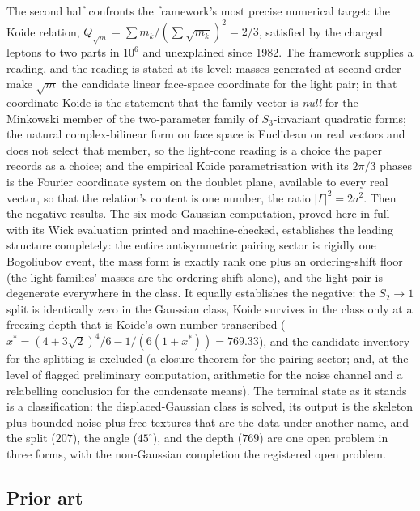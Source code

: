\documentclass[11pt]{article}
\theoremstyle{definition}
\begin{document}
The second half confronts the framework's most precise numerical target: the Koide relation, $Q_{\sqrt{m}} = \sum m_{k} / (\sum \sqrt{m_{k}})^{2} = 2/3$, satisfied by the charged leptons to two parts in $10^{6}$ and unexplained since 1982. The framework supplies a reading, and the reading is stated at its level: masses generated at second order make $\sqrt{m}$ the candidate linear face-space coordinate for the light pair; in that coordinate Koide is the statement that the family vector is \emph{null} for the Minkowski member of the two-parameter family of $S_{3}$-invariant quadratic forms; the natural complex-bilinear form on face space is Euclidean on real vectors and does not select that member, so the light-cone reading is a choice the paper records as a choice; and the empirical Koide parametrisation with its $2\pi/3$ phases is the Fourier coordinate system on the doublet plane, available to every real vector, so that the relation's content is one number, the ratio $|\Gamma|^{2} = 2a^{2}$. Then the negative results. The six-mode Gaussian computation, proved here in full with its Wick evaluation printed and machine-checked, establishes the leading structure completely: the entire antisymmetric pairing sector is rigidly one Bogoliubov event, the mass form is exactly rank one plus an ordering-shift floor (the light families' masses are the ordering shift alone), and the light pair is degenerate everywhere in the class. It equally establishes the negative: the $S_{2} \to 1$ split is identically zero in the Gaussian class, Koide survives in the class only at a freezing depth that is Koide's own number transcribed ($x^{*} = (4+3\sqrt{2})^{4}/6 - 1/(6(1+x^{*})) = 769.33$), and the candidate inventory for the splitting is excluded (a closure theorem for the pairing sector; and, at the level of flagged preliminary computation, arithmetic for the noise channel and a relabelling conclusion for the condensate means). The terminal state as it stands is a classification: the displaced-Gaussian class is solved, its output is the skeleton plus bounded noise plus free textures that are the data under another name, and the split ($207$), the angle ($45^{\circ}$), and the depth ($769$) are one open problem in three forms, with the non-Gaussian completion the registered open problem.

\subsection*{Prior art}
\end{document}
